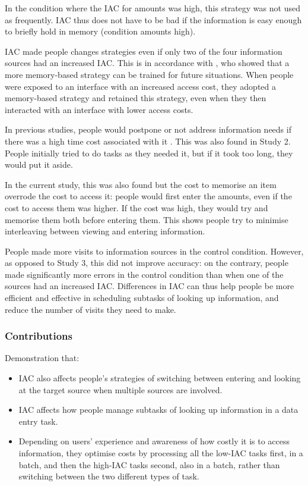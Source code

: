\begin{table}
\begin{itemize}
In the condition where the IAC for amounts was high, this strategy was not used as frequently. 
IAC thus does not have to be bad if the information is easy enough to briefly hold in memory (condition amounts high).

IAC made people changes strategies even if only two of the four information sources had an increased IAC. This is in accordance with \citep{Morgan2014}, who showed that a more memory-based strategy can be trained for future situations. When people were exposed to an interface with an increased access cost, they adopted a memory-based strategy and retained this strategy, even when they then interacted with an interface with lower access costs.

In previous studies, people would postpone or not address information needs if there was a high time cost associated with it \citep{Sohn2008}. This was also found in Study 2. People initially tried to do tasks as they needed it, but if it took too long, they would put it aside.

In the current study, this was also found but the cost to memorise an item overrode the cost to access it: people would first enter the amounts, even if the cost to access them was higher.
If the cost was high, they would try and memorise them both before entering them. This shows people try to minimise interleaving between viewing and entering information. 


People made more visits to information sources in the control condition. However, as opposed to Study 3, this did not improve accuracy: on the contrary, people made significantly more errors in the control condition than when one of the sources had an increased IAC. Differences in IAC can thus help people be more efficient and effective in scheduling subtasks of looking up information, and reduce the number of visits they need to make. 


\subsubsection{Contributions}
Demonstration that:
\begin{itemize}

\item   
IAC also affects people's strategies of switching between entering and looking at the target source when multiple sources are involved.
\item
IAC affects how people manage subtasks of looking up information in a data entry task.
\item
Depending on users' experience and awareness of how costly it is to access information, they optimise costs by processing all the low-IAC tasks first, in a batch, and then the high-IAC tasks second, also in a batch, rather than switching between the two different types of task.  
\end{itemize}


\end{itemize}
\end{table}
